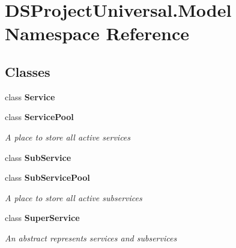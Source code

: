 \section{D\+S\+Project\+Universal.\+Model Namespace Reference}
\label{namespace_d_s_project_universal_1_1_model}
\subsection*{Classes}
\begin{DoxyCompactItemize}
\item 
class \textbf{ Service}
\item 
class \textbf{ Service\+Pool}
\begin{DoxyCompactList}\small\item\em A place to store all active services\end{DoxyCompactList}\item 
class \textbf{ Sub\+Service}
\item 
class \textbf{ Sub\+Service\+Pool}
\begin{DoxyCompactList}\small\item\em A place to store all active subservices\end{DoxyCompactList}\item 
class \textbf{ Super\+Service}
\begin{DoxyCompactList}\small\item\em An abstract represents services and subservices\end{DoxyCompactList}\end{DoxyCompactItemize}
